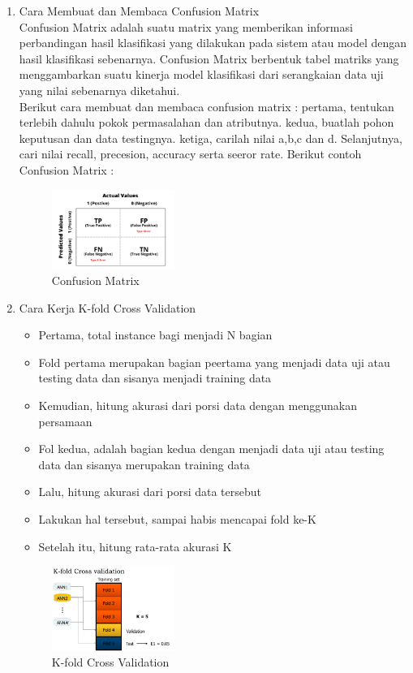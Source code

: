 \begin{enumerate}
\item Cara Membuat dan Membaca Confusion Matrix \\
Confusion Matrix adalah suatu matrix yang memberikan informasi perbandingan hasil klasifikasi yang dilakukan pada sistem atau model dengan hasil klasifikasi sebenarnya. Confusion Matrix berbentuk tabel matriks yang menggambarkan suatu kinerja model klasifikasi dari serangkaian data uji yang nilai sebenarnya diketahui. \\
Berikut cara membuat dan membaca confusion matrix : pertama, tentukan terlebih dahulu pokok permasalahan dan atributnya. kedua, buatlah pohon keputusan dan data testingnya. ketiga, carilah nilai a,b,c dan d. Selanjutnya, cari nilai recall, precesion, accuracy serta seeror rate. Berikut contoh Confusion Matrix :
\begin{figure}[H]
		\includegraphics[width=4cm]{figures/1174054/2/confusion.jpeg}
		\centering
		\caption{Confusion Matrix}
\end{figure}

\item Cara Kerja K-fold Cross Validation 
\begin{itemize}
\item Pertama, total instance bagi menjadi N bagian
\item Fold pertama merupakan bagian peertama yang menjadi data uji atau testing data dan sisanya menjadi training data
\item Kemudian, hitung akurasi dari porsi data dengan menggunakan persamaan
\item Fol kedua, adalah bagian kedua dengan menjadi data uji atau testing data dan sisanya merupakan training data
\item Lalu, hitung akurasi dari porsi data tersebut
\item Lakukan hal tersebut, sampai habis mencapai fold ke-K
\item Setelah itu, hitung rata-rata akurasi K
\end{itemize}
\begin{figure}[H]
		\includegraphics[width=4cm]{figures/1174054/2/kfold.png}
		\centering
		\caption{K-fold Cross Validation}
\end{figure}


\end{enumerate}
